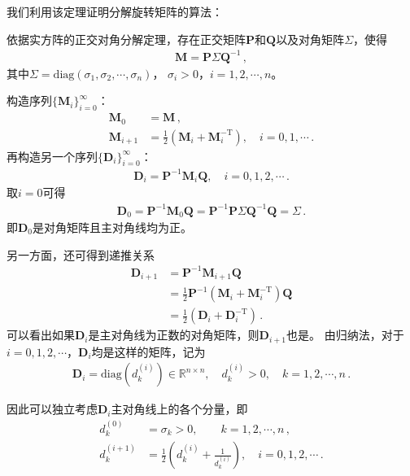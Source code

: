 我们利用该定理证明分解旋转矩阵的算法：
\begin{prove}
    依据实方阵的正交对角分解定理，存在正交矩阵$\bm P$和$\bm Q$以及对角矩阵$\bm \varSigma$，使得
    \begin{align}
        \bm M=\bm P\bm \varSigma\bm Q^{-1}\, ,
    \end{align}
    其中${\bm \varSigma}=\mathrm{diag}(\sigma_1,\sigma_2,\cdots,\sigma_n)$，
    $\sigma_i>0$，$i=1,2,\cdots,n$。

    构造序列$\displaystyle\{\bm M_i\}_{i=0}^{\infty}$：
    \begin{align}
        \bm M_0     & =\bm M\, ,                                                         \\
        \bm M_{i+1} & =\frac{1}{2}(\bm M_i+\bm M_i^{-\mathrm{T}}),\quad i=0,1,\cdots\, .
    \end{align}
    再构造另一个序列$\displaystyle\{\bm D_i\}_{i=0}^{\infty}$：
    \begin{align}
        \bm D_i=\bm P^{-1}\bm M_i\bm Q,\quad i=0,1,2,\cdots\, .
    \end{align}
    取$i=0$可得
    \begin{align}
        \bm D_0=\bm P^{-1}\bm M_0\bm Q=\bm P^{-1}\bm P\bm \varSigma\bm Q^{-1}\bm Q=\bm \varSigma\, .
    \end{align}
    即$\bm D_0$是对角矩阵且主对角线均为正。

    另一方面，还可得到递推关系
    \begin{align}
        \bm D_{i+1} & =\bm P^{-1}\bm M_{i+1}\bm Q\nonumber                                \\
                    & =\frac{1}{2}\bm P^{-1}(\bm M_i+\bm M_i^{-\mathrm{T}})\bm Q\nonumber \\
                    & =\frac{1}{2}(\bm D_i+\bm D_i^{-\mathrm{T}})\, .
    \end{align}
    可以看出如果$\bm D_i$是主对角线为正数的对角矩阵，则$\bm D_{i+1}$也是。
    由归纳法，对于$i=0,1,2,\cdots$，$\bm D_i$均是这样的矩阵，记为
    \begin{align}
        \bm D_i=\mathrm{diag}\left(d_k^{(i)}\right)\in\mathbb{R}^{n\times n}, \quad d_k^{(i)}>0, \quad k=1,2,\cdots,n\, .
    \end{align}

    因此可以独立考虑$\bm D_i$主对角线上的各个分量，即
    \begin{align}
        d_k^{(0)}   & =\sigma_k>0,\qquad k=1,2,\cdots,n\, ,                                                              \\
        d_k^{(i+1)} & = \frac{1}{2}\left(d_k^{(i)}+\frac{1}{d_k^{(i)}}\right),\quad i=0,1,2,\cdots\label{eq:02ex.03}\, .
    \end{align}


\end{prove}
